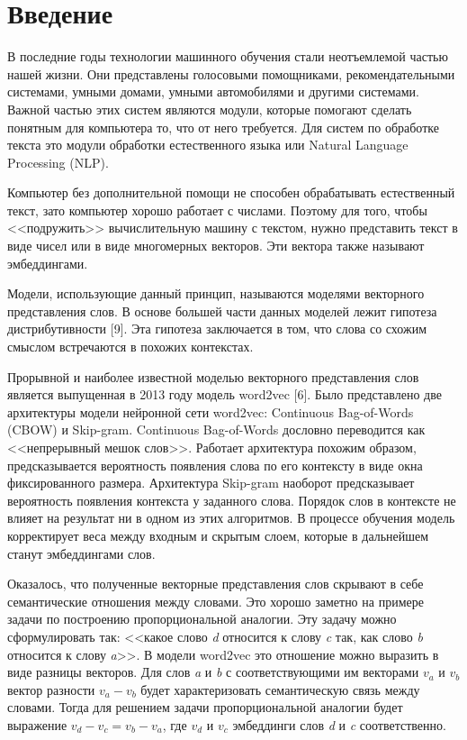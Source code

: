 \documentclass[a4paper,14pt]{article}
\begin{document}
\pagebreak

\tableofcontents
\pagebreak

\section*{Введение}

В последние годы технологии машинного обучения стали неотъемлемой частью нашей жизни. 
Они представлены голосовыми помощниками, рекомендательными системами, умными домами, умными автомобилями и другими системами.
Важной частью этих систем являются модули, которые помогают сделать понятным для компьютера то, что от него требуется.
Для систем по обработке текста это модули обработки естественного языка или Natural Language Processing (NLP).

Компьютер без дополнительной помощи не способен обрабатывать естественный текст, зато компьютер хорошо работает с числами.
Поэтому для того, чтобы <<подружить>> вычислительную машину с текстом, нужно представить текст в виде чисел или в виде многомерных векторов.
Эти вектора также называют эмбеддингами.

Модели, использующие данный принцип, называются моделями векторного представления слов.
В основе большей части данных моделей лежит гипотеза дистрибутивности [9].
Эта гипотеза заключается в том, что слова со схожим смыслом встречаются в похожих контекстах.

Прорывной и наиболее известной моделью векторного представления слов является выпущенная в 2013 году модель word2vec [6].
Было представлено две архитектуры модели нейронной сети word2vec: Continuous Bag-of-Words
(CBOW) и Skip-gram. 
Continuous Bag-of-Words дословно переводится как <<непрерывный мешок слов>>.
Работает архитектура похожим образом, предсказывается вероятность появления слова по его контексту в виде окна фиксированного размера.
Архитектура Skip-gram наоборот предсказывает вероятность появления контекста у заданного слова.
Порядок слов в контексте не влияет на результат ни в одном из этих алгоритмов.
В процессе обучения модель корректирует веса между входным и скрытым слоем, которые в дальнейшем станут эмбеддингами слов.

Оказалось, что полученные векторные представления слов скрывают в себе семантические отношения между словами.
Это хорошо заметно на примере задачи по построению пропорциональной аналогии.
Эту задачу можно сформулировать так: <<какое слово \textit{d} относится к слову \textit{c} так, 
как слово \textit{b} относится к слову \textit{a}>>.
В модели word2vec это отношение можно выразить в виде разницы векторов.
Для слов \textit{a} и \textit{b} с соответствующими им векторами $v_a$ и $v_b$ вектор разности $v_a - v_b$ будет характеризовать семантическую связь между словами.
Тогда для решением задачи пропорциональной аналогии будет выражение $v_d - v_c = v_b - v_a$, где $v_d$ и $v_c$ эмбеддинги слов \textit{d} и \textit{c} соответственно.
\end{document}
